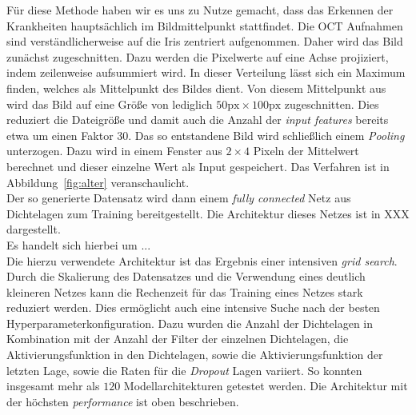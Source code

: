 %
Für diese Methode haben wir es uns zu Nutze gemacht, dass das Erkennen der
Krankheiten hauptsächlich im Bildmittelpunkt stattfindet. Die OCT Aufnahmen
sind verständlicherweise auf die Iris zentriert aufgenommen.
Daher wird das Bild zunächst zugeschnitten. Dazu werden die Pixelwerte auf eine
Achse projiziert, indem zeilenweise aufsummiert wird. In dieser Verteilung
lässt sich ein Maximum finden, welches als Mittelpunkt des Bildes dient.
Von diesem Mittelpunkt aus wird das Bild auf eine Größe von lediglich
$50\text{px}\times100\text{px}$ zugeschnitten. Dies reduziert die Dateigröße
und damit auch die Anzahl der \textit{input features} bereits etwa um einen
Faktor $30$.
Das so entstandene Bild wird schließlich einem \textit{Pooling} unterzogen.
Dazu wird in einem Fenster aus $2\times4$ Pixeln der Mittelwert berechnet und
dieser einzelne Wert als Input gespeichert. Das Verfahren ist in
Abbildung~\ref{fig:alter} veranschaulicht. \\
Der so generierte Datensatz wird dann einem \textit{fully connected} Netz aus
Dichtelagen zum Training bereitgestellt. Die Architektur dieses Netzes ist in
XXX dargestellt.\\
Es handelt sich hierbei um ...\\
Die hierzu verwendete Architektur ist das Ergebnis einer intensiven
\textit{grid search}. Durch die Skalierung des Datensatzes und die Verwendung
eines deutlich kleineren Netzes kann die Rechenzeit für das Training eines
Netzes stark reduziert werden. Dies ermöglicht auch eine intensive Suche nach
der besten Hyperparameterkonfiguration. Dazu wurden die Anzahl der Dichtelagen
in Kombination mit der Anzahl der Filter der einzelnen Dichtelagen, die
Aktivierungsfunktion in den Dichtelagen, sowie die Aktivierungsfunktion der
letzten Lage, sowie die Raten für die \textit{Dropout} Lagen variiert. So
konnten insgesamt mehr als $120$ Modellarchitekturen getestet werden. Die
Architektur mit der höchsten \textit{performance} ist oben beschrieben.
